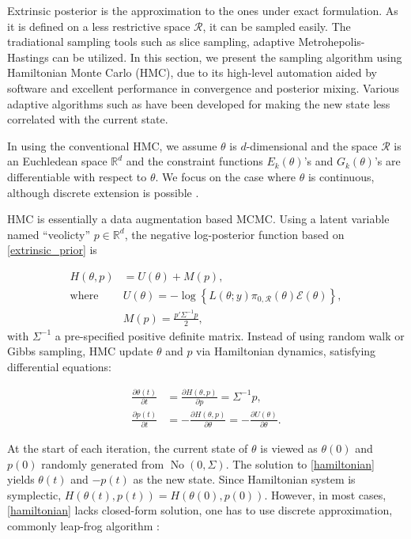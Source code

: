 \documentclass[10pt]{article}
\newcommand{\mc}[1]{\mathcal{#1}}
\DeclareMathOperator{\No}{No}
\DeclareMathOperator{\1}{\mathbbm{1}}
\begin{document}
Extrinsic posterior is the approximation to the ones under exact formulation. As it is defined on a less restrictive space $\mc R$, it can be sampled easily. The tradiational sampling tools such as slice sampling, adaptive Metrohepolis-Hastings can be utilized. In this section, we present the sampling algorithm using Hamiltonian Monte Carlo (HMC), due to its high-level automation aided by software and excellent performance in convergence and posterior mixing. Various adaptive algorithms such as \cite{hoffman2014no} have been developed for making the new state less correlated with the current state.

In using the conventional HMC, we assume $\theta$ is $d$-dimensional and the space $\mc R$ is an Euchledean space $\mathbb R^d$ and the constraint functions $E_k(\theta)$'s and $G_k(\theta)$'s  are differentiable with respect to $\theta$. We focus on the case where $\theta$ is continuous, although discrete extension is possible \citep{zhang2012continuous}.

HMC is essentially a data augmentation based MCMC. Using a latent variable named ``veolicty'' $p\in \mathbb R^d$, the negative log-posterior function based on \eqref{extrinsic_prior} is

\begin{equation}
\begin{aligned}
H(\theta, p)& = U(\theta)+M(p),\\
\text{where } & U(\theta) = -\log\left\{ L(\theta;y)\pi_{0,\mc R}(\theta) \mc{E}(\theta) \right\},\\
& M(p) = \frac{p'\Sigma^{-1} p}{2},\end{aligned}
\end{equation}
with $\Sigma^{-1}$ a pre-specified positive definite matrix. Instead of using random walk or Gibbs sampling, HMC update $\theta$ and $p$ via Hamiltonian dynamics, satisfying differential equations:

\begin{equation}
\begin{aligned}
\label{hamiltonian}
\frac{\partial \theta (t)}{\partial t} & =\frac{\partial H(\theta, p)}{\partial p} = \Sigma^{-1}p,\\
\frac{\partial p(t)}{\partial t}& =-\frac{\partial H(\theta, p)}{\partial \theta} = -\frac{\partial U(\theta)}{\partial \theta}.
\end{aligned}
\end{equation}

At the start of each iteration, the current state of $\theta$ is viewed as $\theta(0)$ and $p(0)$ randomly generated from $\No(0, \Sigma)$. The solution to \eqref{hamiltonian} yields $\theta(t)$ and $-p(t)$ as the new state. Since Hamiltonian system is symplectic, $H(\theta(t),p(t))=H(\theta(0),p(0))$. However, in most cases, \eqref{hamiltonian} lacks closed-form solution, one has to use discrete approximation, commonly leap-frog algorithm \citep{neal2011mcmc}:
\end{document}
